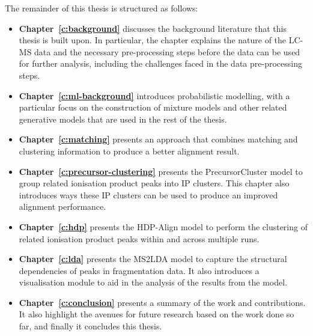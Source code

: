 The remainder of this thesis is structured as follows:

\begin{itemize}
\item \textbf{Chapter~\ref{c:background}} discusses the background literature that this thesis is built upon. In particular, the chapter explains the nature of the LC-MS data and the necessary pre-processing steps before the data can be used for further analysis, including the challenges faced in the data pre-processing steps.
\item \textbf{Chapter~\ref{c:ml-background}} introduces probabilistic modelling, with a particular focus on the construction of mixture models and other related generative models that are used in the rest of the thesis.
\item \textbf{Chapter~\ref{c:matching}} presents an approach that combines matching and clustering information to produce a better alignment result.
\item \textbf{Chapter~\ref{c:precursor-clustering}} presents the PrecursorCluster model to group related ionisation product peaks into IP clusters. This chapter also introduces ways these IP clusters can be used to produce an improved alignment performance.
\item \textbf{Chapter~\ref{c:hdp}} presents the HDP-Align model to perform the clustering of related ionisation product peaks within and across multiple runs. 
\item \textbf{Chapter~\ref{c:lda}} presents the MS2LDA model to capture the structural dependencies of peaks in fragmentation data. It also introduces a visualisation module to aid in the analysis of the results from the model. 
\item \textbf{Chapter~\ref{c:conclusion}} presents a summary of the work and contributions. It also highlight the avenues for future research based on the work done so far, and finally it concludes this thesis. 
\end{itemize}